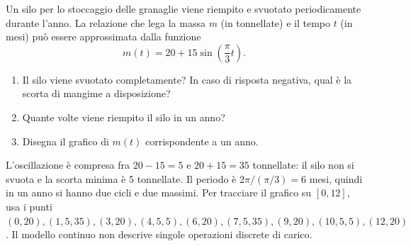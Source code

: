 
\begin{esercizio}
Un silo per lo stoccaggio delle granaglie viene riempito e svuotato periodicamente durante l'anno. La relazione che lega la massa $m$ (in tonnellate) e il tempo $t$ (in mesi) pu\`o essere approssimata dalla funzione
    \[
        m(t)=20+15\sin\left(\frac{\pi}{3}t\right).
    \]
    \begin{enumerate}
        \item Il silo viene svuotato completamente? In caso di risposta negativa, qual \`e la scorta di mangime a disposizione?
        \item Quante volte viene riempito il silo in un anno?
        \item Disegna il grafico di $m(t)$ corrispondente a un anno.
    \end{enumerate}
\end{esercizio}

\begin{soluzione}
L'oscillazione è compresa fra $20-15=5$ e $20+15=35$ tonnellate:
il silo non si svuota e la scorta minima è 5 tonnellate.
Il periodo è $2\pi/(\pi/3)=6$ mesi, quindi in un anno si hanno due cicli e due massimi.
Per tracciare il grafico su $[0,12]$, usa i punti
$(0,20),(1{,}5,35),(3,20),(4{,}5,5),(6,20),(7{,}5,35),(9,20),(10{,}5,5),(12,20)$.
Il modello continuo non descrive singole operazioni discrete di carico.
\end{soluzione}
